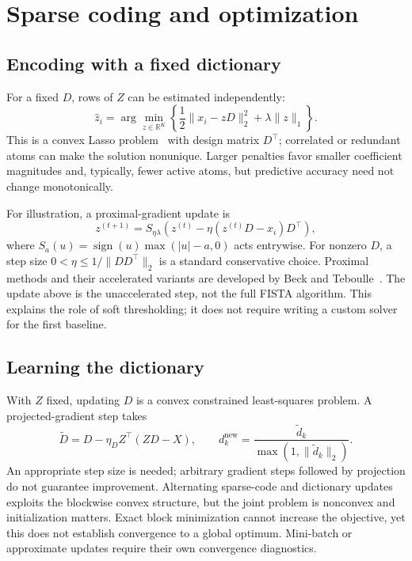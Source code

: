 \documentclass[11pt]{article}
\begin{document}
\section{Sparse coding and optimization}
\subsection{Encoding with a fixed dictionary}
For a fixed $D$, rows of $Z$ can be estimated independently:
\begin{equation}
\widehat z_i=\arg\min_{z\in\mathbb{R}^{K}}
\left\{\frac12\lVert x_i-zD\rVert_2^2+\lambda\lVert z\rVert_1\right\}.
\label{eq:encode}
\end{equation}
This is a convex Lasso problem~\cite{tibshirani1996} with design matrix $D^\top$; correlated or redundant atoms can make the solution nonunique. Larger penalties favor smaller coefficient magnitudes and, typically, fewer active atoms, but predictive accuracy need not change monotonically.

For illustration, a proximal-gradient update is
\[
z^{(t+1)}=S_{\eta\lambda}\!\left(z^{(t)}-\eta(z^{(t)}D-x_i)D^\top\right),
\]
where $S_a(u)=\operatorname{sign}(u)\max(|u|-a,0)$ acts entrywise. For nonzero $D$, a step size $0<\eta\leq1/\lVert DD^\top\rVert_2$ is a standard conservative choice. Proximal methods and their accelerated variants are developed by Beck and Teboulle~\cite{beck2009}. The update above is the unaccelerated step, not the full FISTA algorithm. This explains the role of soft thresholding; it does not require writing a custom solver for the first baseline.

\subsection{Learning the dictionary}
With $Z$ fixed, updating $D$ is a convex constrained least-squares problem. A projected-gradient step takes
\[
\widetilde D=D-\eta_D Z^\top(ZD-X),\qquad
 d_k^{\mathrm{new}}=\frac{\widetilde d_k}{\max(1,\lVert\widetilde d_k\rVert_2)}.
\]
An appropriate step size is needed; arbitrary gradient steps followed by projection do not guarantee improvement. Alternating sparse-code and dictionary updates exploits the blockwise convex structure, but the joint problem is nonconvex and initialization matters. Exact block minimization cannot increase the objective, yet this does not establish convergence to a global optimum. Mini-batch or approximate updates require their own convergence diagnostics.
\end{document}
